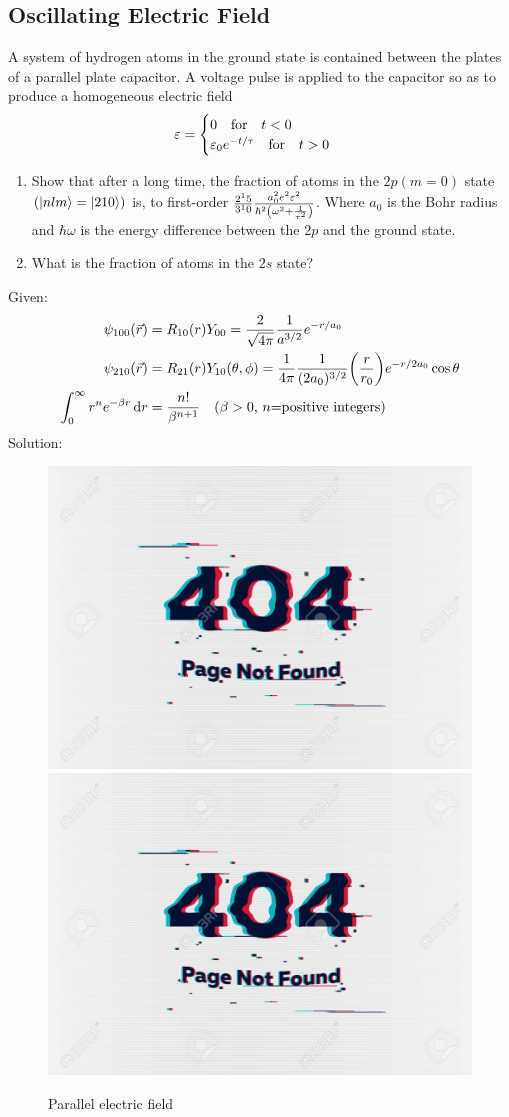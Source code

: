 \subsection{Oscillating Electric Field}
A system of hydrogen atoms in the ground state is contained between the plates of a parallel plate capacitor. A voltage pulse is applied to the capacitor so as to produce a homogeneous electric field
\begin{equation}
\varepsilon = 
\begin{cases}
0 \qq{for} t < 0 \\
\varepsilon_0 e^{-t / \tau} \qq{for} t > 0
\end{cases}
\end{equation}
\begin{enumerate}
	\item Show that after a long time, the fraction of atoms in the $2 p (m=0)$ state $(\ket{n l m} = \ket{2 1 0})$ is, to first-order $\frac{2^15}{3^10} \frac{a_0 ^2 e^2 \varepsilon^2}{\hbar^2 \qty(\omega^2 + \frac{1}{\tau^2})}$. Where $a_0$ is the Bohr radius and $\hbar \omega$ is the energy difference between the $2p$ and the ground state.
	
	\item What is the fraction of atoms in the $2s$ state?
\end{enumerate}
Given:
\begin{align*}
\psi_{1 0 0}(\vec{r}) &= R_{1 0}(r) Y_{0 0} = \frac{2}{\sqrt{4 \pi}} \frac{1}{a^{3/2}} e^{-r / a_0} \\
\psi_{2 1 0}(\vec{r}) &= R_{2 1}(r) Y_{1 0}(\theta,\phi) = \frac{1}{4\pi} \frac{1}{(2 a_0)^{3/2}} \qty(\frac{r}{r_0}) e^{-r / 2 a_0} \cos\theta \\
\int_{0}^{\infty} r^n e^{-\beta r} \dd{r} &= \frac{n!}{\beta^{n + 1}} \qq{($\beta > 0$, $n$=positive integers)}
\end{align*}
Solution:\\

\begin{figure}
	\centering
	\includegraphics[width=0.4\linewidth]{Pictures/not-found.jpg}
	\includegraphics[width=0.4\linewidth]{Pictures/not-found.jpg}
	\caption{Parallel electric field}
	\label{chapter23.fig4}
\end{figure}

